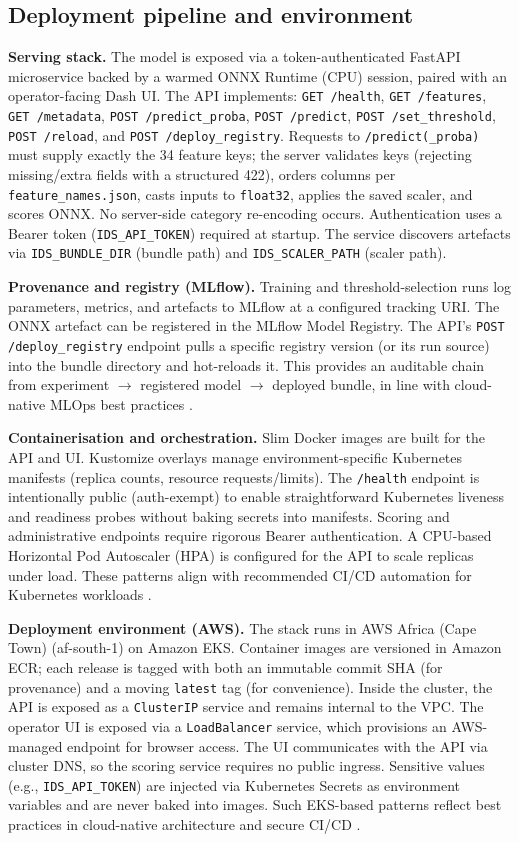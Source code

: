 \documentclass{article}
\begin{document}
\subsection{Deployment pipeline and environment}
\textbf{Serving stack.} The model is exposed via a token-authenticated FastAPI microservice backed by a warmed ONNX Runtime (CPU) session, paired with an operator-facing Dash UI. The API implements: \texttt{GET /health}, \texttt{GET /features}, \texttt{GET /metadata}, \texttt{POST /predict\_proba}, \texttt{POST /predict}, \texttt{POST /set\_threshold}, \texttt{POST /reload}, and \texttt{POST /deploy\_registry}. Requests to \texttt{/predict(\_proba)} must supply exactly the 34 feature keys; the server validates keys (rejecting missing/extra fields with a structured 422), orders columns per \texttt{feature\_names.json}, casts inputs to \texttt{float32}, applies the saved scaler, and scores ONNX. No server-side category re-encoding occurs. Authentication uses a Bearer token (\texttt{IDS\_API\_TOKEN}) required at startup. The service discovers artefacts via \texttt{IDS\_BUNDLE\_DIR} (bundle path) and \texttt{IDS\_SCALER\_PATH} (scaler path).

\textbf{Provenance and registry (MLflow).} Training and threshold-selection runs log parameters, metrics, and artefacts to MLflow at a configured tracking URI. The ONNX artefact can be registered in the MLflow Model Registry. The API’s \texttt{POST /deploy\_registry} endpoint pulls a specific registry version (or its run source) into the bundle directory and hot-reloads it. This provides an auditable chain from experiment $\to$ registered model $\to$ deployed bundle, in line with cloud-native MLOps best practices \cite{naayini2025}.

\textbf{Containerisation and orchestration.} Slim Docker images are built for the API and UI. Kustomize overlays manage environment-specific Kubernetes manifests (replica counts, resource requests/limits). The \texttt{/health} endpoint is intentionally public (auth-exempt) to enable straightforward Kubernetes liveness and readiness probes without baking secrets into manifests. Scoring and administrative endpoints require rigorous Bearer authentication. A CPU-based Horizontal Pod Autoscaler (HPA) is configured for the API to scale replicas under load. These patterns align with recommended CI/CD automation for Kubernetes workloads \cite{shrestha2024}.

\textbf{Deployment environment (AWS).} The stack runs in AWS Africa (Cape Town) (af-south-1) on Amazon EKS. Container images are versioned in Amazon ECR; each release is tagged with both an immutable commit SHA (for provenance) and a moving \texttt{latest} tag (for convenience). Inside the cluster, the API is exposed as a \texttt{ClusterIP} service and remains internal to the VPC. The operator UI is exposed via a \texttt{LoadBalancer} service, which provisions an AWS-managed endpoint for browser access. The UI communicates with the API via cluster DNS, so the scoring service requires no public ingress. Sensitive values (e.g., \texttt{IDS\_API\_TOKEN}) are injected via Kubernetes Secrets as environment variables and are never baked into images. Such EKS-based patterns reflect best practices in cloud-native architecture and secure CI/CD \cite{shevchuk2023}.
\end{document}
